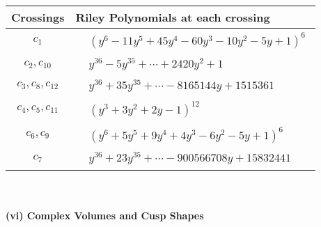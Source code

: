\documentclass[1p]{elsarticle_modified}
\theoremstyle{definition}
\begin{document}
\begin{tabular}{m{50pt}|m{274pt}}
Crossings & \hspace{64pt}Riley Polynomials at each crossing \\
\hline $$\begin{aligned}c_{1}\end{aligned}$$&$\begin{aligned}
&(y^6-11 y^5+45 y^4-60 y^3-10 y^2-5 y+1)^6
\end{aligned}$\\
\hline $$\begin{aligned}c_{2},c_{10}\end{aligned}$$&$\begin{aligned}
&y^{36}-5 y^{35}+\cdots+2420 y^2+1
\end{aligned}$\\
\hline $$\begin{aligned}c_{3},c_{8},c_{12}\end{aligned}$$&$\begin{aligned}
&y^{36}+35 y^{35}+\cdots-8165144 y+1515361
\end{aligned}$\\
\hline $$\begin{aligned}c_{4},c_{5},c_{11}\end{aligned}$$&$\begin{aligned}
&(y^3+3 y^2+2 y-1)^{12}
\end{aligned}$\\
\hline $$\begin{aligned}c_{6},c_{9}\end{aligned}$$&$\begin{aligned}
&(y^6+5 y^5+9 y^4+4 y^3-6 y^2-5 y+1)^6
\end{aligned}$\\
\hline $$\begin{aligned}c_{7}\end{aligned}$$&$\begin{aligned}
&y^{36}+23 y^{35}+\cdots-900566708 y+15832441
\end{aligned}$\\
\hline
\end{tabular}\\~\\
\newpage\flushleft \textbf{(vi) Complex Volumes and Cusp Shapes}
\end{document}
